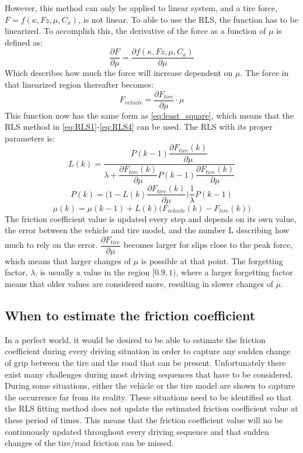 However, this method can only be applied to linear system, and a tire force, $F=f(\kappa, Fz, \mu, C_{x})$, is not linear. To able to use the RLS, the function has to be linearized. To accomplish this, the derivative of the force as a function of $ \mu $ is defined as:
\begin{equation}
	\dfrac{\partial F}{\partial \mu} = \dfrac{\partial f(\kappa, Fz, \mu, C_{x})}{\partial \mu}
\end{equation}
Which describes how much the force will increase dependent on $ \mu $. The force in that linearized region thereafter becomes:
\begin{equation}
	F_{vehicle} = \dfrac{\partial F_{tire}}{\partial \mu} \cdot \mu
\end{equation}
This function now has the same form as \ref{eq:least_square}, which means that the RLS method in \ref{eq:RLS1}-\ref{eq:RLS4} can be used. The RLS with its proper parameters is:
\begin{equation}
	L(k) =\dfrac{ P(k-1) \dfrac{\partial F_{tire}(k)}{\partial \mu}}{\lambda + \dfrac{\partial F_{tire}(k)}{\partial \mu} P(k-1) \dfrac{\partial F_{tire}(k)}{\partial \mu}} 
\end{equation}
\begin{equation}
	P(k) = \Bigg( 1 - L(k) \dfrac{\partial F_{tire}(k)}{\partial \mu} \Bigg) \dfrac{1}{\lambda} P(k-1)
\end{equation}
\begin{equation}
	\mu (k) = \mu (k-1) + L(k) \Big( F_{vehicle} (k) - F_{tire} (k) \Big)
\end{equation}
The friction coefficient value is updated every step and depends on its own value, the error between the vehicle and tire model, and the number L describing how much to rely on the error. $ \dfrac{\partial F_{tire}}{\partial \mu} $ becomes larger for slips close to the peak force, which means that larger changes of $ \mu $ is possible at that point. The forgetting factor, $ \lambda $, is usually a value in the region $ [0.9, 1) $, where a larger forgetting factor means that older values are considered more, resulting in slower changes of $ \mu $.

\subsection{When to estimate the friction coefficient}
In a perfect world, it would be desired to be able to estimate the friction coefficient during every driving situation in order to capture any sudden change of grip between the tire and the road that can be present. Unfortunately there exist many challenges during most driving sequences that have to be considered. During some situations, either the vehicle or the tire model are shown to capture the occurrence far from its reality. These situations need to be identified so that the RLS fitting method does not update the estimated friction coefficient value at these period of times. This means that the friction coefficient value will no be continuously updated throughout every driving sequence and that sudden changes of the tire/road friction can be missed.

